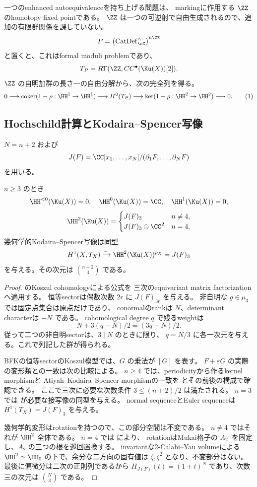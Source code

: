 一つのenhanced autoequivalenceを持ち上げる問題は、
markingに作用する \(\ZZ\) のhomotopy fixed pointである。
\(\ZZ\) は一つの可逆射で自由生成されるので、追加の有限群関係を課していない。
\[
 P=\left(\operatorname{CatDef}_{\cC}^{\wedge}\right)^{h\ZZ}
\]
と置くと、これはformal moduli problemであり、
\[
 T_P=R\Gamma(\ZZ,CC^\bullet(\Ku(X))[2]).
\]
\(\ZZ\) の自明加群の長さ一の自由分解から、次の完全列を得る。
\[
 0\longrightarrow
 \operatorname{coker}(1-\rho:\HH^1\to\HH^1)
 \longrightarrow H^0(T_P)
 \longrightarrow
 \ker(1-\rho:\HH^2\to\HH^2)
 \longrightarrow0.                                      \tag{1}\label{eq:tangent}
\]

\subsection{Hochschild計算とKodaira--Spencer写像}

\(N=n+2\) および
\[
 J(F)=\CC[x_1,\ldots,x_N]/(\partial_1F,\ldots,\partial_NF)
\]
を用いる。

\begin{lemma}\label{lem:HH}
 \(n\ge3\) のとき
 \[
 \HH^{<0}(\Ku(X))=0,\quad \HH^0(\Ku(X))=\CC,\quad
 \HH^1(\Ku(X))=0,
 \]
 \[
 \HH^2(\Ku(X))=
 \begin{cases}
 J(F)_3& n\ne4,\\
 J(F)_3\oplus\CC^2& n=4.
 \end{cases}
 \]
 幾何学的Kodaira--Spencer写像は同型
 \[
 H^1(X,T_X)\xrightarrow{\sim}
 \HH^2(\Ku(X))^{\rho_X}=J(F)_3
 \]
 を与える。その次元は \(\binom{n+2}{3}\) である。
\end{lemma}
\begin{proof}
 \cite[Theorem 5.39]{BFK} のKoszul cohomologyによる公式を
 三次のequivariant matrix factorizationへ適用する。
 恒等sectorは偶数次数 \(2r\) に \(J(F)_{3r}\) を与える。
 非自明な \(g\in\mu_3\) では固定点集合は原点だけであり、
 conormalのrankは \(N\)、determinant characterは \(-N\) である。
 cohomological degree \(q\) で残るweightは
 \[
 N+3(q-N)/2=(3q-N)/2.
 \]
 従って二つの非自明sectorは、\(3\mid N\) のときに限り、
 \(q=N/3\) に各一次元を与える。これで列記した群が得られる。

 BFKの恒等sectorのKoszul模型では、\(G\) の乗法が \([G]\) を表す。
 \(F+\varepsilon G\) の実際の変形類との一致は次の比較による。
 \(n\ge4\) では、periodicityから作るkernel morphismと
 Atiyah--Kodaira--Spencer morphismの一致を
 \cite[Lemma 2.19]{HR} とその前後の構成で確認できる。
 ここで三次に必要な次数条件 \(3\le(n+2)/2\) は満たされる。
 \(n=3\) では \cite[Theorem 4.4(2)]{JLLZ} が必要な接写像の同型を与える。
 normal sequenceとEuler sequenceは \(H^1(T_X)=J(F)_3\) を与える。

 幾何学的変形はrotationを持つので、この部分空間は不変である。
 \(n\ne4\) ではそれが \(\HH^2\) 全体である。
 \(n=4\) では \cite[Proposition 3.12]{Huy} により、
 rotationはMukai格子の \(A_2^\perp\) を固定し、\(A_2\) の三つの根を巡回置換する。
 invariantな2-Calabi--Yau volumeによる
 \(\HH^2\simeq\HH_0\) の下で、余分な二方向の固有値は
 \(\zeta,\zeta^2\) となり、不変部分はない。
 最後に偏微分は二次の正則列であるから
 \(H_{J(F)}(t)=(1+t)^N\) であり、次数三の次元は \(\binom N3\) である。
\end{proof}

